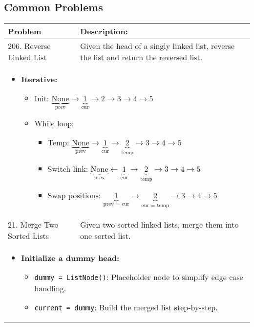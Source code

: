 \subsection{Common Problems}
\begin{summary}
    \begin{center}
        \begin{tabular}{ll}
            \toprule
            \textbf{Problem} & \textbf{Description:} \\
            \midrule
                206. Reverse Linked List & Given the head of a singly linked list, reverse the list and return the reversed list. \\
                \multicolumn{2}{p{\linewidth}}{
                    \begin{itemize}
                        \item \textbf{Iterative:} 
                        \begin{itemize}
                            \item Init: $\underbrace{\text{None}}_{\text{prev}} \rightarrow \underbrace{1}_{\text{cur}} \rightarrow 2 \rightarrow 3 \rightarrow 4 \rightarrow 5$
                            \item While loop: 
                            \begin{itemize}
                                \item Temp: $\underbrace{\text{None}}_{\text{prev}} \rightarrow \underbrace{1}_{\text{cur}} \rightarrow \underbrace{2}_{\text{temp}} \rightarrow 3 \rightarrow 4 \rightarrow 5$
                                \item Switch link: $\underbrace{\text{None}}_{\text{prev}} \leftarrow \underbrace{1}_{\text{cur}} \rightarrow \underbrace{2}_{\text{temp}} \rightarrow 3 \rightarrow 4 \rightarrow 5$
                                \item Swap positions: $\underbrace{1}_{\text{prev = cur}} \rightarrow \underbrace{2}_{\text{cur = temp}} \rightarrow 3 \rightarrow 4 \rightarrow 5$
                            \end{itemize}
                        \end{itemize}                        
                    \end{itemize}
                } \\
                \midrule
                21. Merge Two Sorted Lists & Given two sorted linked lists, merge them into one sorted list. \\
                \multicolumn{2}{p{\linewidth}}{
                    \begin{itemize}
                        \item \textbf{Initialize a dummy head:} 
                        \begin{itemize}
                            \item \texttt{dummy = ListNode()}: Placeholder node to simplify edge case handling. 
                            \item \texttt{current = dummy}: Build the merged list step-by-step.
                        \end{itemize}
                    

\end{itemize}}
\end{tabular}
\end{center}
\end{summary}
